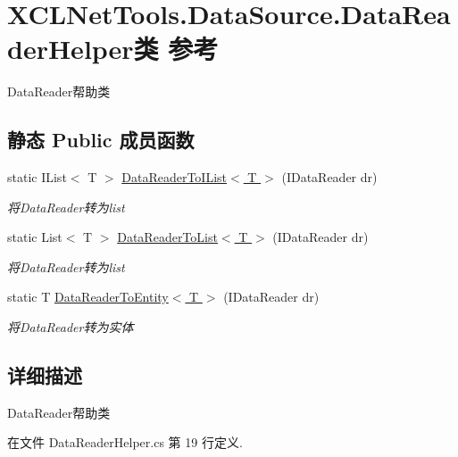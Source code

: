 \hypertarget{class_x_c_l_net_tools_1_1_data_source_1_1_data_reader_helper}{}\section{X\+C\+L\+Net\+Tools.\+Data\+Source.\+Data\+Reader\+Helper类 参考}
\label{class_x_c_l_net_tools_1_1_data_source_1_1_data_reader_helper}


Data\+Reader帮助类  


\subsection*{静态 Public 成员函数}
\begin{DoxyCompactItemize}
\item 
static I\+List$<$ T $>$ \hyperlink{class_x_c_l_net_tools_1_1_data_source_1_1_data_reader_helper_a7e8cba70bdd08088fc42871b8a70ac61}{Data\+Reader\+To\+I\+List$<$ T $>$} (I\+Data\+Reader dr)
\begin{DoxyCompactList}\small\item\em 将\+Data\+Reader转为list \end{DoxyCompactList}\item 
static List$<$ T $>$ \hyperlink{class_x_c_l_net_tools_1_1_data_source_1_1_data_reader_helper_a61caafd1243257c18c0419ebf314572e}{Data\+Reader\+To\+List$<$ T $>$} (I\+Data\+Reader dr)
\begin{DoxyCompactList}\small\item\em 将\+Data\+Reader转为list \end{DoxyCompactList}\item 
static T \hyperlink{class_x_c_l_net_tools_1_1_data_source_1_1_data_reader_helper_ab6533be97af0cbbe12a5df81ddbbb573}{Data\+Reader\+To\+Entity$<$ T $>$} (I\+Data\+Reader dr)
\begin{DoxyCompactList}\small\item\em 将\+Data\+Reader转为实体 \end{DoxyCompactList}\end{DoxyCompactItemize}


\subsection{详细描述}
Data\+Reader帮助类 



在文件 Data\+Reader\+Helper.\+cs 第 19 行定义.



